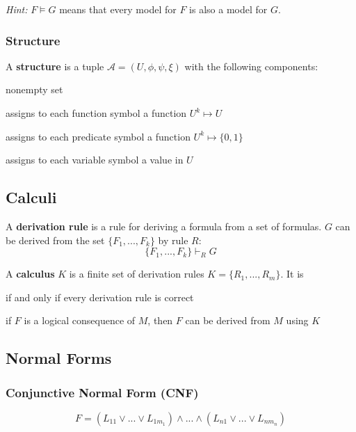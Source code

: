 \documentclass[11pt]{article}
\begin{document}
\emph{Hint:} $F \models G$ means that every model for $F$ is also a model for $G$.

\subsubsection{Structure}

A \textbf{structure} is a tuple $\mathcal{A} = (U, \phi, \psi, \xi)$ with the following components:
\begin{description}[labelindent=16pt,style=multiline,leftmargin=3cm, noitemsep]
	\item[universe $U$:] nonempty set
	\item[function $\phi$:] assigns to each function symbol a function $U^k \mapsto U$
	\item[function $\psi$:] assigns to each predicate symbol a function $U^k \mapsto \{0,1\}$
	\item[function $\xi$:] assigns to each variable symbol a value in $U$
\end{description}

\subsection{Calculi}

A \textbf{derivation rule} is a rule for deriving a formula from a set of formulas. $G$ can be derived from the set $\{F_1,...,F_k\}$ by rule $R$:
\begin{equation*}
	\{F_1,...,F_k\} \vdash_R G
\end{equation*}

A \textbf{calculus} $K$ is a finite set of derivation rules $K = \{R_1,...,R_m\}$. It is
\begin{description}[labelindent=16pt,style=multiline,leftmargin=4cm, noitemsep]
	\item[sound/correct] if and only if every derivation rule is correct
	\item[complete] if $F$ is a logical consequence of $M$, then $F$ can be derived from $M$ using $K$
\end{description}

\subsection{Normal Forms}

\subsubsection{Conjunctive Normal Form (CNF)}
\begin{equation*}
	F = (L_{11} \lor ... \lor L_{1m_1}) \land ... \land (L_{n1} \lor ... \lor L_{nm_n})
\end{equation*}
\end{document}
